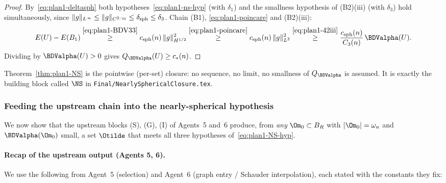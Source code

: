 \begin{proof}
By~\eqref{eq:plan1-deltasph} both
hypotheses~\eqref{eq:plan1-ns-hyp} (with $\delta_{1}$) and the smallness
hypothesis of (B2)(iii) (with $\delta_{3}$) hold simultaneously, since
$\|g\|_{L^{\infty}}\le\|g\|_{C^{2,\gamma_{0}}}\le\delta_{\rm sph}\le\delta_{3}$.
Chain (B1), \eqref{eq:plan1-poincare} and (B2)(iii):
\[
   E(U)-E(B_{1})
   \overset{\eqref{eq:plan1-BDV33}}{\ge}
   c_{\rm sph}(n)\,\|g\|_{H^{1/2}}^{2}
   \overset{\eqref{eq:plan1-poincare}}{\ge}
   c_{\rm sph}(n)\,\|g\|_{L^{2}}^{2}
   \overset{\eqref{eq:plan1-42iii}}{\ge}
   \frac{c_{\rm sph}(n)}{C_{3}(n)}\,\BDValpha(U).
\]
Dividing by $\BDValpha(U)>0$ gives $Q_{\BDValpha}(U)\ge c_{*}(n)$.
\end{proof}

Theorem~\ref{thm:plan1-NS} is the pointwise (per-set) closure: no
sequence, no limit, no smallness of $Q_{\BDValpha}$ is assumed. It is
exactly the building block called $\NS$ in
\texttt{Final/NearlySphericalClosure.tex}.

\subsubsection{Feeding the upstream chain into the
nearly-spherical hypothesis}
\label{sec:plan1-feed-graph}

We now show that the upstream blocks (S), (G), (I) of Agents~5 and~6
produce, from \emph{any} $\Om_{0}\subset B_{R}$ with $|\Om_{0}|=\omega_{n}$
and $\BDValpha(\Om_{0})$ small, a set $\Otilde$ that meets all three
hypotheses of~\eqref{eq:plan1-NS-hyp}.

\paragraph{Recap of the upstream output (Agents 5, 6).}
We use the following from Agent~5 (selection) and Agent~6
(graph entry / Schauder interpolation), each stated with the constants
they fix:

